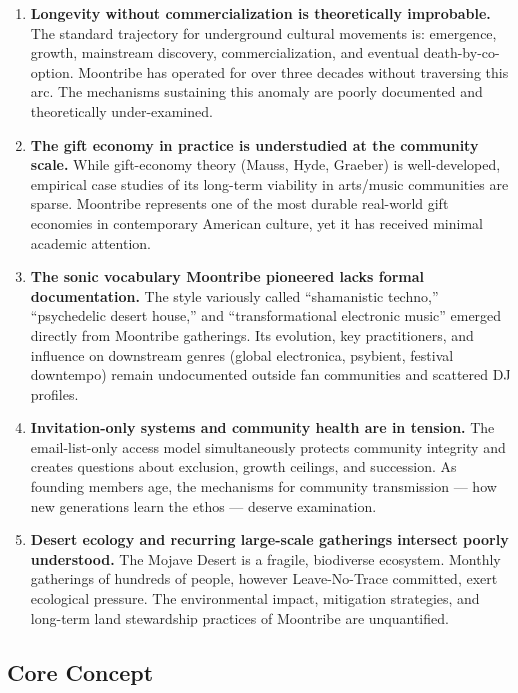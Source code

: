 \documentclass[11pt,letterpaper]{article}
\begin{document}
\begin{enumerate}
  \item \textbf{Longevity without commercialization is theoretically improbable.} The standard trajectory for underground cultural movements is: emergence, growth, mainstream discovery, commercialization, and eventual death-by-co-option. Moontribe has operated for over three decades without traversing this arc. The mechanisms sustaining this anomaly are poorly documented and theoretically under-examined.

  \item \textbf{The gift economy in practice is understudied at the community scale.} While gift-economy theory (Mauss, Hyde, Graeber) is well-developed, empirical case studies of its long-term viability in arts/music communities are sparse. Moontribe represents one of the most durable real-world gift economies in contemporary American culture, yet it has received minimal academic attention.

  \item \textbf{The sonic vocabulary Moontribe pioneered lacks formal documentation.} The style variously called ``shamanistic techno,'' ``psychedelic desert house,'' and ``transformational electronic music'' emerged directly from Moontribe gatherings. Its evolution, key practitioners, and influence on downstream genres (global electronica, psybient, festival downtempo) remain undocumented outside fan communities and scattered DJ profiles.

  \item \textbf{Invitation-only systems and community health are in tension.} The email-list-only access model simultaneously protects community integrity and creates questions about exclusion, growth ceilings, and succession. As founding members age, the mechanisms for community transmission --- how new generations learn the ethos --- deserve examination.

  \item \textbf{Desert ecology and recurring large-scale gatherings intersect poorly understood.} The Mojave Desert is a fragile, biodiverse ecosystem. Monthly gatherings of hundreds of people, however Leave-No-Trace committed, exert ecological pressure. The environmental impact, mitigation strategies, and long-term land stewardship practices of Moontribe are unquantified.
\end{enumerate}

\subsection{Core Concept}
\end{document}
